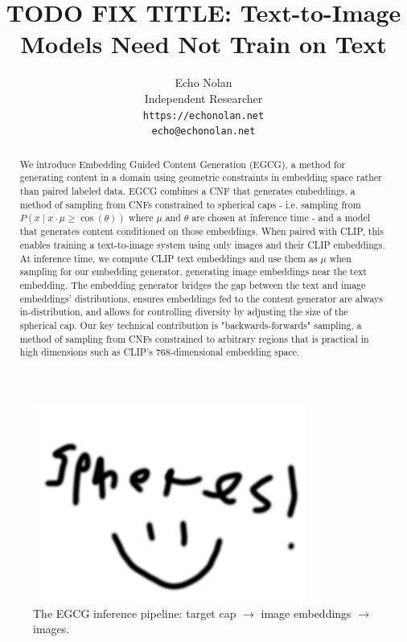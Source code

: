 \documentclass{article} %
\title{TODO FIX TITLE: Text-to-Image Models Need Not Train on Text}
\author{Echo Nolan \\
Independent Researcher \\
\texttt{https://echonolan.net} \\
\texttt{echo@echonolan.net} \\
}
\begin{document}
\maketitle

\begin{abstract}
We introduce Embedding Guided Content Generation (EGCG), a method for generating content in a domain
using geometric constraints in embedding space rather than paired labeled data. EGCG combines a CNF
that generates embeddings, a method of sampling from CNFs constrained to spherical caps - i.e.
sampling from $P(x \mid x \cdot \mu \geq \cos(\theta))$ where $\mu$ and $\theta$ are chosen at
inference time - and a model that generates content conditioned on those embeddings. When paired
with CLIP, this enables training a text-to-image system using only images and their CLIP embeddings.
At inference time, we compute CLIP text embeddings and use them as $\mu$ when sampling for our
embedding generator, generating image embeddings near the text embedding. The embedding generator
bridges the gap between the text and image embeddings' distributions, ensures embeddings fed to the
content generator are always in-distribution, and allows for controlling diversity by adjusting the
size of the spherical cap. Our key technical contribution is "backwards-forwards" sampling, a method
of sampling from CNFs constrained to arbitrary regions that is practical in high dimensions such as
CLIP's 768-dimensional embedding space.
\end{abstract}

\begin{figure}[h]
\centering
\includegraphics[width=0.8\textwidth]{star figure}
\caption{The EGCG inference pipeline: target cap $\rightarrow$ image embeddings $\rightarrow$ images.}
\label{fig:star}
\end{figure}
\end{document}

